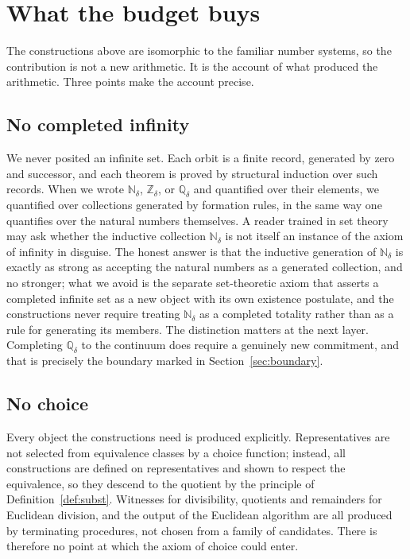 \documentclass[11pt,a4paper]{article}
\theoremstyle{definition}
\theoremstyle{remark}
\newcommand{\Nd}{\mathbb{N}_\delta}
\newcommand{\Zd}{\mathbb{Z}_\delta}
\newcommand{\Qd}{\mathbb{Q}_\delta}
\begin{document}
\section{What the budget buys}\label{sec:discussion}

The constructions above are isomorphic to the familiar number systems, so the
contribution is not a new arithmetic. It is the account of what produced the
arithmetic. Three points make the account precise.

\subsection{No completed infinity}

We never posited an infinite set. Each orbit is a finite record, generated by
zero and successor, and each theorem is proved by structural induction over such
records. When we wrote $\Nd$, $\Zd$, or $\Qd$ and quantified over their elements,
we quantified over collections generated by formation rules, in the same way one
quantifies over the natural numbers themselves. A reader trained in set theory
may ask whether the inductive collection $\Nd$ is not itself an instance of the
axiom of infinity in disguise. The honest answer is that the inductive
generation of $\Nd$ is exactly as strong as accepting the natural numbers as a
generated collection, and no stronger; what we avoid is the separate
set-theoretic axiom that asserts a completed infinite set as a new object with
its own existence postulate, and the constructions never require treating $\Nd$
as a completed totality rather than as a rule for generating its members. The
distinction matters at the next layer. Completing $\Qd$ to the continuum does
require a genuinely new commitment, and that is precisely the boundary marked in
Section~\ref{sec:boundary}.

\subsection{No choice}

Every object the constructions need is produced explicitly. Representatives are
not selected from equivalence classes by a choice function; instead, all
constructions are defined on representatives and shown to respect the
equivalence, so they descend to the quotient by the principle of
Definition~\ref{def:subst}. Witnesses for divisibility, quotients and
remainders for Euclidean division, and the output of the Euclidean algorithm are
all produced by terminating procedures, not chosen from a family of candidates.
There is therefore no point at which the axiom of choice could enter.
\end{document}
